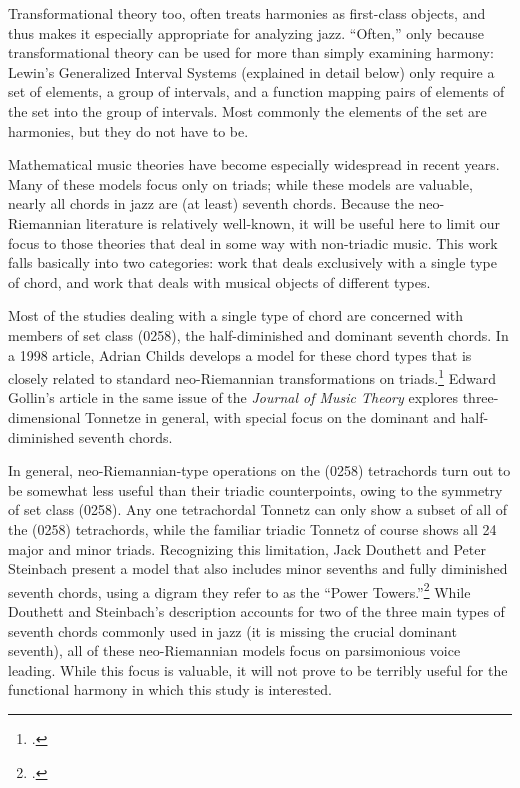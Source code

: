 Transformational theory too, often treats harmonies as first-class objects,
and thus makes it especially appropriate for analyzing jazz. “Often,” only
because transformational theory can be used for more than simply examining
harmony: Lewin’s Generalized Interval Systems (explained in detail below) only
require a set of elements, a group of intervals, and a function mapping pairs
of elements of the set into the group of intervals.
Most commonly the elements of the set are harmonies, but they do not have to
be.

Mathematical music theories have become especially widespread in recent
years. Many of these models focus only on triads; while these
models are valuable, nearly all chords in jazz are (at least) seventh chords.
Because the neo-Riemannian literature is relatively well-known, it will be
useful here to limit our focus to those theories that deal in some way with
non-triadic music. This work falls basically into two categories: work
that deals exclusively with a single type of chord, and work that deals with
musical objects of different types.

Most of the studies dealing with a single type of chord are concerned with
members of set class (0258), the half-diminished and dominant seventh chords.
In a 1998 article, Adrian Childs develops a model for these chord types that
is closely related to standard neo-Riemannian transformations on
triads.\footcite{childs:1998} Edward Gollin’s article in the same issue of the
\emph{Journal of Music Theory} explores three-dimensional Tonnetze in
general, with special focus on the dominant and half-diminished seventh
chords.

In general, neo-Riemannian-type operations on the (0258) tetrachords turn out
to be somewhat less useful than their triadic counterpoints, owing to the
symmetry of set class (0258). Any one tetrachordal Tonnetz can only
show a subset of all of the (0258) tetrachords, while the familiar triadic
Tonnetz of course shows all 24 major and minor triads.  Recognizing this
limitation, Jack Douthett and Peter Steinbach present a model that also
includes minor sevenths and fully diminished seventh chords, using a digram
they refer to as the “Power Towers.”\footcite[255--56]{douthettsteinbach:1998}
While Douthett and Steinbach’s description accounts for two of the three main
types of seventh chords commonly used in jazz (it is missing the crucial
dominant seventh), all of these neo-Riemannian models focus on parsimonious
voice leading. While this focus is valuable, it will not prove to be terribly
useful for the functional harmony in which this study is interested.

